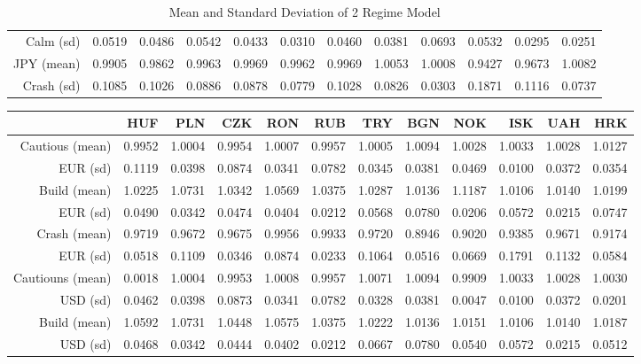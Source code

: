 \documentclass[12pt, a4paper, oneside]{article} %
\begin{document}
\begin{landscape}
\begin{table}[ht]
\begin{tabular}{rrrrrrrrrrrr}
  Calm (sd) & 0.0519 & 0.0486 & 0.0542 & 0.0433 & 0.0310 & 0.0460 & 0.0381 & 0.0693 & 0.0532 & 0.0295 & 0.0251 \\ 
  JPY (mean) & 0.9905 & 0.9862 & 0.9963 & 0.9969 & 0.9962 & 0.9969 & 1.0053 & 1.0008 & 0.9427 & 0.9673 & 1.0082 \\ 
  Crash (sd) & 0.1085 & 0.1026 & 0.0886 & 0.0878 & 0.0779 & 0.1028 & 0.0826 & 0.0303 & 0.1871 & 0.1116 & 0.0737 \\ 
   \hline
\end{tabular}
\caption{Mean and Standard Deviation of 2 Regime Model}
\label{tabref:2StateProb}
\end{table}
\end{landscape}

\begin{landscape}
\begin{table}[ht]
\centering
\begin{tabular}{rrrrrrrrrrrr}
  \hline
 & HUF & PLN & CZK & RON & RUB & TRY & BGN & NOK & ISK & UAH & HRK \\ 
  \hline
Cautious (mean) & 0.9952 & 1.0004 & 0.9954 & 1.0007 & 0.9957 & 1.0005 & 1.0094 & 1.0028 & 1.0033 & 1.0028 & 1.0127 \\ 
  EUR (sd) & 0.1119 & 0.0398 & 0.0874 & 0.0341 & 0.0782 & 0.0345 & 0.0381 & 0.0469 & 0.0100 & 0.0372 & 0.0354 \\ 
Build (mean) & 1.0225 & 1.0731 & 1.0342 & 1.0569 & 1.0375 & 1.0287 & 1.0136 & 1.1187 & 1.0106 & 1.0140 & 1.0199 \\ 
EUR (sd) & 0.0490 & 0.0342 & 0.0474 & 0.0404 & 0.0212 & 0.0568 & 0.0780 & 0.0206 & 0.0572 & 0.0215 & 0.0747 \\ 
Crash (mean)& 0.9719 & 0.9672 & 0.9675 & 0.9956 & 0.9933 & 0.9720 & 0.8946 & 0.9020 & 0.9385 & 0.9671 & 0.9174 \\ 
EUR (sd) & 0.0518 & 0.1109 & 0.0346 & 0.0874 & 0.0233 & 0.1064 & 0.0516 & 0.0669 & 0.1791 & 0.1132 & 0.0584 \\ 
\hline
Cautiouns (mean)& 0.0018 & 1.0004 & 0.9953 & 1.0008 & 0.9957 & 1.0071 & 1.0094 & 0.9909 & 1.0033 & 1.0028 & 1.0030 \\ 
USD (sd) & 0.0462 & 0.0398 & 0.0873 & 0.0341 & 0.0782 & 0.0328 & 0.0381 & 0.0047 & 0.0100 & 0.0372 & 0.0201 \\ 
Build (mean)& 1.0592 & 1.0731 & 1.0448 & 1.0575 & 1.0375 & 1.0222 & 1.0136 & 1.0151 & 1.0106 & 1.0140 & 1.0187 \\ 
USD (sd) & 0.0468 & 0.0342 & 0.0444 & 0.0402 & 0.0212 & 0.0667 & 0.0780 & 0.0540 & 0.0572 & 0.0215 & 0.0512 \\ 

\end{tabular}
\end{table}
\end{landscape}
\end{document}
